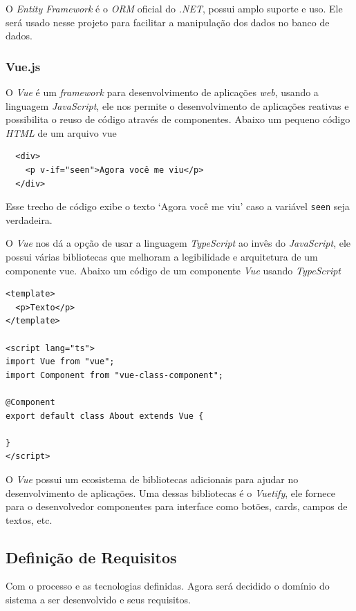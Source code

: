 \documentclass[12pt]{article}
\begin{document}
O \textit{Entity Framework} é o \textit{ORM} oficial do \textit{.NET}, possui amplo suporte e uso. Ele será
usado nesse projeto para facilitar a manipulação dos dados no banco de dados.

\subsubsection{Vue.js}

O \textit{Vue} é um \textit{framework} para desenvolvimento de aplicações \textit{web}, usando a linguagem \textit{JavaScript},
ele nos permite o desenvolvimento de aplicações reativas e possibilita o reuso
de código através de componentes. Abaixo um pequeno código \textit{HTML} de um arquivo vue

\begin{verbatim}
  <div>
    <p v-if="seen">Agora você me viu</p>
  </div>
\end{verbatim}

Esse trecho de código exibe o texto `Agora você me viu' caso a variável \verb|seen| seja verdadeira.

O \textit{Vue} nos dá a opção de usar a linguagem \textit{TypeScript} ao invês do \textit{JavaScript}, ele possui
várias bibliotecas que melhoram a legibilidade e arquitetura de um componente vue.
Abaixo um código de um componente \textit{Vue} usando \textit{TypeScript}

\begin{verbatim}
<template>
  <p>Texto</p>
</template>

<script lang="ts">
import Vue from "vue";
import Component from "vue-class-component";

@Component
export default class About extends Vue {

}
</script>
\end{verbatim}

O \textit{Vue} possui um ecosistema de bibliotecas adicionais para ajudar no desenvolvimento de aplicações.
Uma dessas bibliotecas é o \textit{Vuetify}, ele fornece para o desenvolvedor componentes para interface
como botões, cards, campos de textos, etc.

\subsection{Definição de Requisitos}

Com o processo e as tecnologias definidas. Agora será decidido o domínio do sistema a ser desenvolvido
e seus requisitos.
\end{document}
